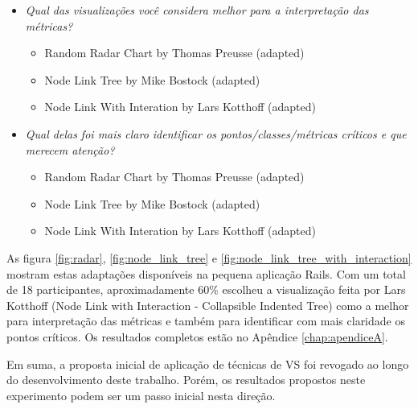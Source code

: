 \begin{itemize}
  \item[] \textit{Qual das visualizações você considera melhor para a
	interpretação das métricas?}
		\begin{itemize}
			\item {Random Radar Chart by Thomas Preusse (adapted)}
			\item {Node Link Tree by Mike Bostock (adapted)}
			\item {Node Link With Interation by Lars Kotthoff (adapted)}
		\end{itemize}
  \item[] \textit{Qual delas foi mais claro identificar os
	pontos/classes/métricas críticos e que merecem atenção?}
		\begin{itemize}
			\item {Random Radar Chart by Thomas Preusse (adapted)}
			\item {Node Link Tree by Mike Bostock (adapted)}
			\item {Node Link With Interation by Lars Kotthoff (adapted)}
		\end{itemize}
\end{itemize}

As figura \ref{fig:radar}, \ref{fig:node_link_tree} e
\ref{fig:node_link_tree_with_interaction} mostram estas adaptações disponíveis
na pequena aplicação Rails.
%
Com um total de 18 participantes, aproximadamente 60\% escolheu a visualização
feita por Lars Kotthoff (Node Link with Interaction - Collapsible Indented
Tree) como a melhor para interpretação das métricas e também para identificar
com mais claridade os pontos críticos. Os resultados completos estão no Apêndice
\ref{chap:apendiceA}.

Em suma, a proposta inicial de aplicação de técnicas de VS foi revogado ao
longo do desenvolvimento deste trabalho. Porém, os resultados propostos neste
experimento podem ser um passo inicial nesta direção. 


